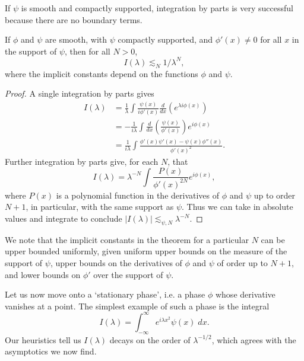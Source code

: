 If $\psi$ is smooth and compactly supported, integration by parts is very successful because there are no boundary terms.

\begin{theorem}
    If $\phi$ and $\psi$ are smooth, with $\psi$ compactly supported, and $\phi'(x) \neq 0$ for all $x$ in the support of $\psi$, then for all $N > 0$,
    \[ I(\lambda) \lesssim_N 1/\lambda^N, \]
    where the implicit constants depend on the functions $\phi$ and $\psi$.
\end{theorem}
\begin{proof}
  A single integration by parts gives
  \begin{align*} I(\lambda) &= \frac{1}{\lambda} \int \frac{\psi(x)}{i \phi'(x)} \frac{d}{dx} \left( e^{\lambda i \phi(x)} \right)\\
  &= - \frac{1}{i \lambda} \int \frac{d}{dx} \left( \frac{\psi(x)}{\phi'(x)} \right) e^{i \phi(x)}\\
  &= \frac{1}{i \lambda} \int \frac{\phi'(x) \psi'(x) - \psi(x) \phi''(x)}{\phi'(x)^2}.
  \end{align*}
  Further integration by parts give, for each $N$, that
  \[ I(\lambda) = \lambda^{-N} \int \frac{P(x)}{\phi'(x)^{2N}} e^{i \phi(x)}, \]
  where $P(x)$ is a polynomial function in the derivatives of $\phi$ and $\psi$ up to order $N+1$, in particular, with the same support as $\psi$. Thus we can take in absolute values and integrate to conclude $|I(\lambda)| \lesssim_{\psi,N} \lambda^{-N}$.
\end{proof}

\begin{remark}
  We note that the implicit constants in the theorem for a particular $N$ can be upper bounded uniformly, given uniform upper bounds on the measure of the support of $\psi$, upper bounds on the derivatives of $\phi$ and $\psi$ of order up to $N+1$, and lower bounds on $\phi'$ over the support of $\psi$.
\end{remark}

Let us now move onto a `stationary phase', i.e. a phase $\phi$ whose derivative vanishes at a point. The simplest example of such a phase is the integral
%
\[ I(\lambda) = \int_{-\infty}^\infty e^{i \lambda x^2} \psi(x)\; dx. \]
%
Our heuristics tell us $I(\lambda)$ decays on the order of $\lambda^{-1/2}$, which agrees with the asymptotics we now find.


